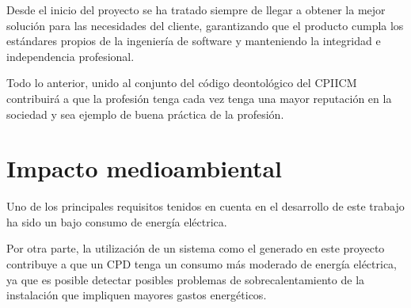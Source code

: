 Desde el inicio del proyecto se ha tratado siempre de llegar a obtener la mejor solución para las necesidades del cliente, garantizando que el producto cumpla los estándares propios de la ingeniería de software y manteniendo la integridad e independencia profesional.

Todo lo anterior, unido al conjunto del código deontológico del CPIICM~\cite{cpiicm_codigo_2012} contribuirá a que la profesión tenga cada vez tenga una mayor reputación en la sociedad y sea ejemplo de buena práctica de la profesión.

\section{Impacto medioambiental}\label{sec:impacto-medioambiental}
Uno de los principales requisitos tenidos en cuenta en el desarrollo de este trabajo ha sido un bajo consumo de energía eléctrica.

Por otra parte, la utilización de un sistema como el generado en este proyecto contribuye a que un CPD tenga un consumo más moderado de energía eléctrica, ya que es posible detectar posibles problemas de sobrecalentamiento de la instalación que impliquen mayores gastos energéticos.
